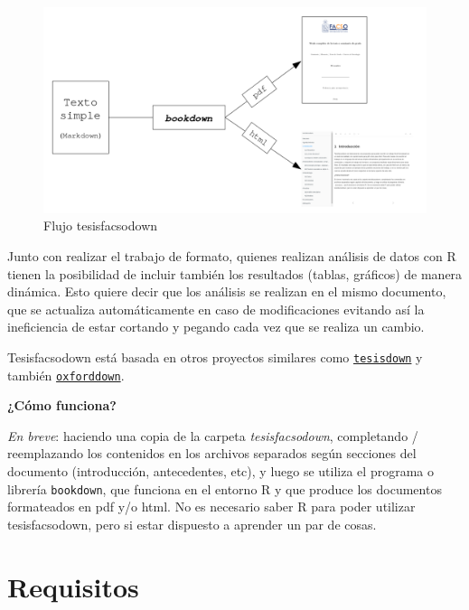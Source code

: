 \documentclass[12pt,twoside]{templates/facsothesis}
\begin{document}
\begin{figure}

{\centering \includegraphics[width=1\linewidth]{images/flujobookdown} 

}

\caption{Flujo tesisfacsodown}\label{fig:flujo}
\end{figure}

Junto con realizar el trabajo de formato, quienes realizan análisis de datos con R tienen la posibilidad de incluir también los resultados (tablas, gráficos) de manera dinámica. Esto quiere decir que los análisis se realizan en el mismo documento, que se actualiza automáticamente en caso de modificaciones evitando así la ineficiencia de estar cortando y pegando cada vez que se realiza un cambio.

Tesisfacsodown está basada en otros proyectos similares como \href{https://github.com/ismayc/thesisdown}{\texttt{tesisdown}} y también \href{https://github.com/ulyngs/oxforddown}{\texttt{oxforddown}}.

\textbf{¿Cómo funciona?}

\emph{En breve}: haciendo una copia de la carpeta \emph{tesisfacsodown}, completando / reemplazando los contenidos en los archivos separados según secciones del documento (introducción, antecedentes, etc), y luego se utiliza el programa o librería \texttt{bookdown}, que funciona en el entorno R y que produce los documentos formateados en pdf y/o html. No es necesario saber R para poder utilizar tesisfacsodown, pero si estar dispuesto a aprender un par de cosas.

\hypertarget{requisitos}{%
\section{Requisitos}\label{requisitos}}
\end{document}
